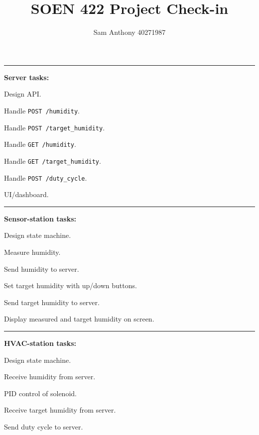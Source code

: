 \documentclass{article}
\title{SOEN 422 Project Check-in}
\author{Sam Anthony 40271987}
\newcommand{\cmark}{\ding{51}}%
\newcommand{\done}{\rlap{$\square$}{\raisebox{2pt}{\large\hspace{1pt}\cmark}}%
\hspace{-2.5pt}}
\begin{document}
\maketitle

\par\noindent\rule{\textwidth}{0.4pt}
\textbf{Server  tasks:}
\begin{todolist}
	\item[\done] Design API.
	\item[\done] Handle \texttt{POST /humidity}.
	\item[\done] Handle \texttt{POST /target\_humidity}.
	\item[\done] Handle \texttt{GET /humidity}.
	\item[\done] Handle \texttt{GET /target\_humidity}.
	\item[\done] Handle \texttt{POST /duty\_cycle}.
	\item UI/dashboard.
\end{todolist}

\par\noindent\rule{\textwidth}{0.4pt}
\textbf{Sensor-station tasks:}
\begin{todolist}
	\item[\done] Design state machine.
	\item[\done] Measure humidity.
	\item[\done] Send humidity to server.
	\item Set target humidity with up/down buttons.
	\item Send target humidity to server.
	\item Display measured and target humidity on screen.
\end{todolist}

\par\noindent\rule{\textwidth}{0.4pt}
\textbf{HVAC-station tasks:}
\begin{todolist}
	\item[\done] Design state machine.
	\item[\done] Receive humidity from server.
	\item[\done] PID control of solenoid.
	\item Receive target humidity from server.
	\item Send duty cycle to server.
\end{todolist}
\end{document}
